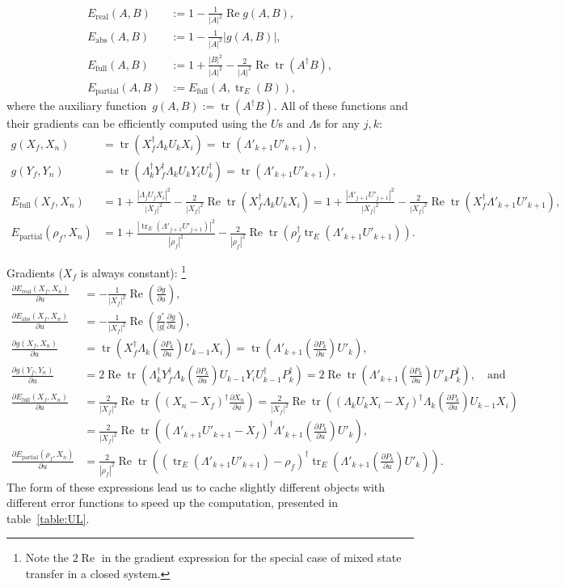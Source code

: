 \documentclass[aps, pra, a4paper, longbibliography]{revtex4}
\DeclareMathOperator{\tr}{tr}
\DeclareMathOperator{\re}{Re}
\newcommand{\dd}[2]{\frac{\partial #1}{\partial #2}}
\begin{document}
\begin{align}
E_\text{real}(A, B) &:= 1 -\frac{1}{|A|^2} \re g(A, B),\\
E_\text{abs}(A, B) &:= 1 -\frac{1}{|A|^2} |g(A, B)|,\\
E_\text{full}(A, B) &:= 1 +\frac{|B|^2}{|A|^2} -\frac{2}{|A|^2} \re \tr(A^\dagger B),\\
E_\text{partial}(A, B) &:= E_\text{full}(A, \tr_E(B)),
\end{align}
where the auxiliary function~$g(A, B) := \tr(A^\dagger B)$.
All of these functions and their gradients can be efficiently computed
using the $U$s and $\Lambda$s
for any $j, k$:
\begin{align}
g(X_f, X_n) &= \tr(X_f^\dagger \Lambda_k U_k X_i)
= \tr(\Lambda'_{k+1} U'_{k+1}),\\
g(Y_f, Y_n) &= \tr(\Lambda_k^\dagger Y_f^\dagger \Lambda_k U_k Y_i U_k^\dagger)
= \tr(\Lambda'_{k+1} U'_{k+1}),\\
E_\text{full}(X_f, X_n) &= 1 +\frac{|\Lambda_j U_j X_i|^2}{|X_f|^2} -\frac{2}{|X_f|^2} \re \tr(X_f^\dagger \Lambda_k U_k X_i)
= 1 +\frac{|\Lambda'_{j+1} U'_{j+1}|^2}{|X_f|^2} -\frac{2}{|X_f|^2} \re \tr(X_f^\dagger \Lambda'_{k+1} U'_{k+1}),\\
E_\text{partial}(\rho_f, X_n)
&= 1 +\frac{|\tr_E(\Lambda'_{j+1} U'_{j+1})|^2}{|\rho_f|^2} -\frac{2}{|\rho_f|^2} \re \tr(\rho_f^\dagger \tr_E(\Lambda'_{k+1} U'_{k+1})).
\end{align}


Gradients ($X_f$ is always constant):
\footnote{Note the $2 \re$ in the gradient expression  
for the special case of mixed state transfer in a closed system.}
\begin{align}
\dd{E_\text{real}(X_f,X_n)}{u}
&= -\frac{1}{|X_f|^2} \re \left( \dd{g}{u} \right),\\
\dd{E_\text{abs}(X_f,X_n)}{u}
&= -\frac{1}{|X_f|^2} \re \left(\frac{g^*}{|g|} \dd{g}{u} \right),\\
\dd{g(X_f, X_n)}{u} &= \tr(X_f^\dagger \Lambda_{k} \left(\dd{P_k}{u}\right) U_{k-1} X_i)
= \tr(\Lambda'_{k+1} \left(\dd{P_k}{u}\right) U'_{k}),\\
\dd{g(Y_f, Y_n)}{u} &= 2 \re \tr\left(\Lambda_k^\dagger Y_f^\dagger \Lambda_k \left(\dd{P_k}{u}\right) U_{k-1} Y_i U_{k-1}^\dagger P_k^\dagger \right)
= 2 \re \tr\left(\Lambda'_{k+1} \left(\dd{P_k}{u}\right) U'_{k} P_k^\dagger \right), \quad \text{and}\\
\dd{E_\text{full}(X_f, X_n)}{u}
&= \frac{2}{|X_f|^2} \re \tr\left((X_n-X_f)^\dagger \dd{X_n}{u}\right)
= \frac{2}{|X_f|^2} \re \tr\left((\Lambda_k U_k X_i -X_f)^\dagger  \Lambda_{k} \left(\dd{P_k}{u}\right) U_{k-1} X_i \right)\\
&= \frac{2}{|X_f|^2} \re \tr\left((\Lambda'_{k+1} U'_{k+1} -X_f)^\dagger  \Lambda'_{k+1} \left(\dd{P_k}{u}\right) U'_{k} \right),\\
\dd{E_\text{partial}(\rho_f, X_n)}{u}
&= \frac{2}{|\rho_f|^2} \re \tr\left((\tr_E(\Lambda'_{k+1} U'_{k+1}) -\rho_f)^\dagger  \tr_E(\Lambda'_{k+1} \left(\dd{P_k}{u}\right) U'_{k}) \right).
\end{align}
The form of these expressions lead us to cache slightly different objects with
different error functions to speed up the computation, presented in table~\ref{table:UL}.
\end{document}
